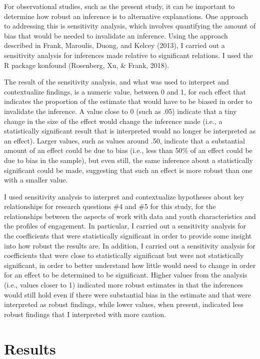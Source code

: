 \documentclass[]{book}
\theoremstyle{definition}
\theoremstyle{definition}
\theoremstyle{definition}
\theoremstyle{remark}
\begin{document}
For observational studies, such as the present study, it can be
important to determine how robust an inference is to alternative
explanations. One approach to addressing this is sensitivity analysis,
which involves quantifying the amount of bias that would be needed to
invalidate an inference. Using the approach described in Frank,
Maroulis, Duong, and Kelcey (2013), I carried out a sensitivity analysis
for inferences made relative to significant relations. I used the R
package konfound (Rosenberg, Xu, \& Frank, 2018).

The result of the sensitivity analysis, and what was used to interpret
and contextualize findings, is a numeric value, between 0 and 1, for
each effect that indicates the proportion of the estimate that would
have to be biased in order to invalidate the inference. A value close to
0 (such as .05) indicate that a tiny change in the size of the effect
would change the inference made (i.e., a statistically significant
result that is interpreted would no longer be interpreted as an effect).
Larger values, such as values around .50, indicate that a substantial
amount of an effect could be due to bias (i.e., less than 50\% of an
effect could be due to bias in the sample), but even still, the same
inference about a statistically significant could be made, suggesting
that such an effect is more robust than one with a smaller value.

I used sensitivity analysis to interpret and contextualize hypotheses
about key relationships for research questions \#4 and \#5 for this
study, for the relationships between the aspects of work with data and
youth characteristics and the profiles of engagement. In particular, I
carried out a sensitivity analysis for the coefficients that were
statistically significant in order to provide some insight into how
robust the results are. In addition, I carried out a sensitivity
analysis for coefficients that were close to statistically significant
but were not statistically significant, in order to better understand
how little would need to change in order for an effect to be determined
to be significant. Higher values from the analysis (i.e., values closer
to 1) indicated more robust estimates in that the inferences would still
hold even if there were substantial bias in the estimate and that were
interpreted as robust findings, while lower values, when present,
indicated less robust findings that I interpreted with more caution.

\chapter{Results}\label{results}
\end{document}
